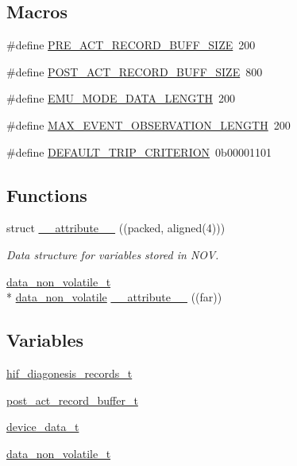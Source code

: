 \subsection*{Macros}
\begin{DoxyCompactItemize}
\item 
\#define \hyperlink{a00022_a18dcecc16ded13fa622e0913e73442e6}{P\+R\+E\+\_\+\+A\+C\+T\+\_\+\+R\+E\+C\+O\+R\+D\+\_\+\+B\+U\+F\+F\+\_\+\+S\+I\+Z\+E}~200
\item 
\#define \hyperlink{a00022_ab1ad440de86fff80e517ad748de2ee39}{P\+O\+S\+T\+\_\+\+A\+C\+T\+\_\+\+R\+E\+C\+O\+R\+D\+\_\+\+B\+U\+F\+F\+\_\+\+S\+I\+Z\+E}~800
\item 
\#define \hyperlink{a00022_af4c3a8ad94feb4d7bda7f107f34baf41}{E\+M\+U\+\_\+\+M\+O\+D\+E\+\_\+\+D\+A\+T\+A\+\_\+\+L\+E\+N\+G\+T\+H}~200
\item 
\#define \hyperlink{a00022_aa060aeb1ecb530b3c6f6d91060999b70}{M\+A\+X\+\_\+\+E\+V\+E\+N\+T\+\_\+\+O\+B\+S\+E\+R\+V\+A\+T\+I\+O\+N\+\_\+\+L\+E\+N\+G\+T\+H}~200
\item 
\#define \hyperlink{a00022_a0ff9495f8521ea7698e83e7b4d6a6985}{D\+E\+F\+A\+U\+L\+T\+\_\+\+T\+R\+I\+P\+\_\+\+C\+R\+I\+T\+E\+R\+I\+O\+N}~0b00001101
\end{DoxyCompactItemize}
\subsection*{Functions}
\begin{DoxyCompactItemize}
\item 
struct \hyperlink{a00022_ad8187eb7fe09751a387e3dcb11c51565}{\+\_\+\+\_\+attribute\+\_\+\+\_\+} ((packed, aligned(4)))
\begin{DoxyCompactList}\small\item\em Data structure for variables stored in N\+O\+V. \end{DoxyCompactList}\item 
\hyperlink{a00022_a8e66478e65e03ebc9434466e51c0ad0b}{data\+\_\+non\+\_\+volatile\+\_\+t} \\*
\hyperlink{a00060_a76ac5f917f5308dcd83de0d7c94559fb}{data\+\_\+non\+\_\+volatile} \hyperlink{a00022_a3d17731ce5498daee9906584158ea997}{\+\_\+\+\_\+attribute\+\_\+\+\_\+} ((far))
\end{DoxyCompactItemize}
\subsection*{Variables}
\begin{DoxyCompactItemize}
\item 
\hyperlink{a00022_a4726b814166e222a6f13e21453f76d8d}{hif\+\_\+diagonesis\+\_\+records\+\_\+t}
\item 
\hyperlink{a00022_a826f1702f1b63c184df702204bea5122}{post\+\_\+act\+\_\+record\+\_\+buffer\+\_\+t}
\item 
\hyperlink{a00022_a95029dff9c90f6a6907353ba86eb3f33}{device\+\_\+data\+\_\+t}
\item 
\hyperlink{a00022_a8e66478e65e03ebc9434466e51c0ad0b}{data\+\_\+non\+\_\+volatile\+\_\+t}
\end{DoxyCompactItemize}


